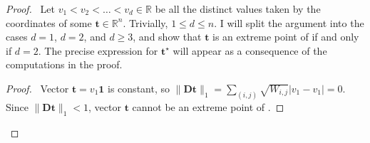 \begin{proof}
    \pf\  Let $v_1 < v_2 < \dots < v_d \in \mathbb{R}$ be all the distinct values taken by the coordinates of some $\mathbf{t} \in \mathbb{R}^{n}$. Trivially, $1 \leq d \leq n$. I will split the argument into the cases $d = 1$, $d = 2$, and $d \geq 3$, and show that $\mathbf{t}$ is an extreme point of  if and only if $d = 2$. The precise expression for $\mathbf{t}^\star$ will appear as a consequence of the computations in the proof.

        \begin{proof}
            \pf\ Vector $\mathbf{t} = v_1 \mathbf{1}$ is constant, so $\|\mathbf{Dt}\|_1 = \sum_{(i,j)} \sqrt{W_{i,j}} |v_1 - v_1| = 0$. Since $\|\mathbf{Dt}\|_1 < 1$, vector $\mathbf{t}$ cannot be an extreme point of .
        \end{proof}


\end{proof}
